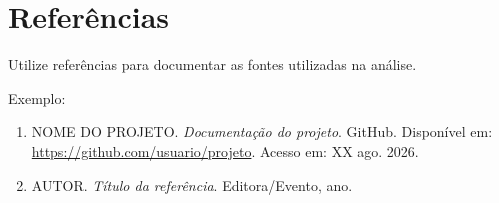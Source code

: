 \section*{Referências}

Utilize referências para documentar as fontes utilizadas na análise.

Exemplo:

\begin{enumerate}

\item
NOME DO PROJETO. \textit{Documentação do projeto}.
GitHub. Disponível em:
\url{https://github.com/usuario/projeto}.
Acesso em: XX ago. 2026.

\item
AUTOR. \textit{Título da referência}.
Editora/Evento, ano.

\end{enumerate}
